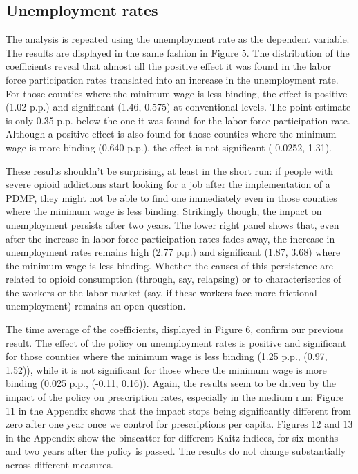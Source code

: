 \documentclass[12pt,a4paper]{article}
\begin{document}
\subsection*{Unemployment rates}

The analysis is repeated using the unemployment rate as the dependent variable.
The results are displayed in the same fashion in Figure 5.
The distribution of the coefficients reveal that almost all the positive effect it was found in the labor force participation rates translated into an increase in the unemployment rate.
For those counties where the minimum wage is less binding, the effect is positive (1.02 p.p.) and significant (1.46, 0.575) at conventional levels. 
The point estimate is only 0.35 p.p. below the one it was found for the labor force participation rate.
Although a positive effect is also found for those counties where the minimum wage is more binding (0.640 p.p.), the effect is not significant (-0.0252, 1.31).

These results shouldn't be surprising, at least in the short run: if people with severe opioid addictions start looking for a job after the implementation of a PDMP, they might not be able to find one immediately even in those counties where the minimum wage is less binding.
Strikingly though, the impact on unemployment persists after two years.
The lower right panel shows that, even after the increase in labor force participation rates fades away, the increase in unemployment rates remains high (2.77 p.p.) and significant (1.87, 3.68) where the minimum wage is less binding.
Whether the causes of this persistence are related to opioid consumption (through, say, relapsing) or to characterisctics of the workers or the labor market (say, if these workers face more frictional unemployment) remains an open question.

\begin{comment}
    After six months:
    1.01   1.48   0.543
    -0.0981 0.199 -0.396

    After two years:
    2.77   3.68   1.87
    -0.0720 0.265 -0.409 
\end{comment}

The time average of the coefficients, displayed in Figure 6, confirm our previous result.
The effect of the policy on unemployment rates is positive and significant for those counties where the minimum wage is less binding (1.25 p.p., (0.97, 1.52)), while it is not significant for those where the minimum wage is more binding (0.025 p.p., (-0.11, 0.16)).
Again, the results seem to be driven by the impact of the policy on prescription rates, especially in the medium run: Figure 11 in the Appendix shows that the impact stops being significantly different from zero after one year once we control for prescriptions per capita.
Figures 12 and 13 in the Appendix show the binscatter for different Kaitz indices, for six months and two years after the policy is passed.
The results do not change substantially across different measures.
\end{document}
